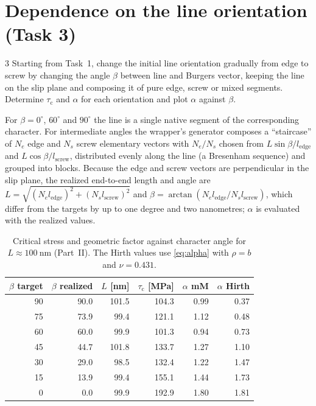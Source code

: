 \documentclass[11pt,a4paper]{article}
\numberwithin{equation}{section}
\theoremstyle{remark}
\newcommand{\tauc}{\tau_{\mathrm{c}}}
\begin{document}
\section{Dependence on the line orientation (Task 3)}\label{sec:task3}

\begin{task}{3}
  Starting from Task~1, change the initial line orientation gradually from edge to screw by changing
  the angle $\beta$ between line and Burgers vector, keeping the line on the slip plane and composing it
  of pure edge, screw or mixed segments. Determine $\tauc$ and $\alpha$ for each orientation and plot
  $\alpha$ against $\beta$.
\end{task}

For $\beta = 0^\circ$, $60^\circ$ and $90^\circ$ the line is a single native segment of the
corresponding character. For intermediate angles the wrapper's generator composes a ``staircase'' of
$N_e$ edge and $N_s$ screw elementary vectors with $N_e/N_s$ chosen from
$L\sin\beta/l_{\mathrm{edge}}$ and $L\cos\beta/l_{\mathrm{screw}}$, distributed evenly along the line
(a Bresenham sequence) and grouped into blocks. Because the edge and screw vectors are perpendicular in
the slip plane, the realized end-to-end length and angle are
$L = \sqrt{(N_e l_{\mathrm{edge}})^2 + (N_s l_{\mathrm{screw}})^2}$ and
$\beta = \arctan(N_e l_{\mathrm{edge}}/N_s l_{\mathrm{screw}})$, which differ from the targets by up to
one degree and two nanometres; $\alpha$ is evaluated with the realized values.

\begin{table}[ht]
  \centering
  \caption{Critical stress and geometric factor against character angle for $L \approx
    \SI{100}{\nano\metre}$ (Part~II). The Hirth values use \cref{eq:alpha} with $\rho = b$ and
    $\nu = 0.431$.}
  \label{tab:beta}
  \begin{tabular}{rrrrrr}
    \toprule
    $\beta$ target & $\beta$ realized & $L$ [nm] & $\tauc$ [MPa] & $\alpha$ mM & $\alpha$ Hirth \\
    \midrule
    90 & 90.0 & 101.5 & 104.3 & 0.99 & 0.37 \\
    75 & 73.9 &  99.4 & 121.1 & 1.12 & 0.48 \\
    60 & 60.0 &  99.9 & 101.3 & 0.94 & 0.73 \\
    45 & 44.7 & 101.8 & 133.7 & 1.27 & 1.10 \\
    30 & 29.0 &  98.5 & 132.4 & 1.22 & 1.47 \\
    15 & 13.9 &  99.4 & 155.1 & 1.44 & 1.73 \\
     0 &  0.0 &  99.9 & 192.9 & 1.80 & 1.81 \\
    \bottomrule
  \end{tabular}
\end{table}
\end{document}
